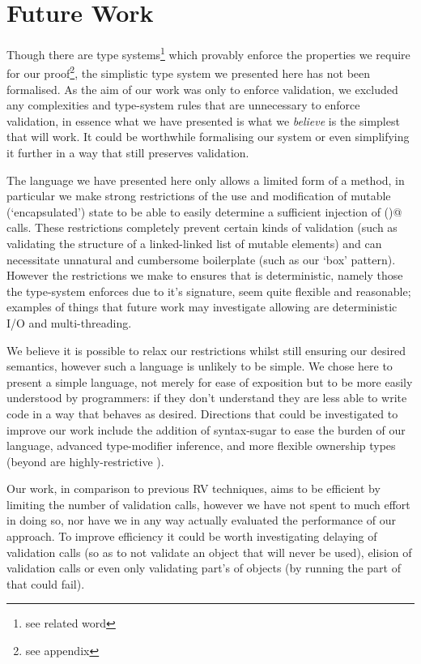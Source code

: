 \section{Future Work}
Though there are type systems\footnote{see related word} which provably enforce the properties we require for our proof\footnote{see appendix}, the simplistic type system we presented here has not been formalised. As the aim of our work was only to enforce validation, we excluded any complexities and type-system rules that are unnecessary to enforce validation, in essence what we have presented is what we \emph{believe} is the simplest that will work. It could be worthwhile formalising our system or even simplifying it further in a way that still preserves validation.

The language we have presented here only allows a limited form of a \Q@validate@ method, in particular we make strong restrictions of the use and modification of mutable (‘encapsulated’) state to be able to easily determine a sufficient injection of \Q@validate()@ calls. These restrictions completely prevent certain kinds of validation (such as validating the structure of a linked-linked list of mutable elements) and can necessitate unnatural and cumbersome boilerplate (such as our ‘box’ pattern). However the restrictions we make to ensures that \Q@validate@ is deterministic, namely those the type-system enforces due to it’s signature, seem quite flexible and reasonable; examples of things that future work may investigate allowing are deterministic I/O and multi-threading. 


We believe it is possible to relax our restrictions whilst still ensuring our desired semantics, however such a language is unlikely to be simple. We chose here to present a simple language, not merely for ease of exposition but to be more easily understood by programmers: if they don’t understand they are less able to write code in a way that behaves as desired. Directions that could be investigated to improve our work include the addition of syntax-sugar to ease the burden of our language, advanced type-modifier inference, and more flexible ownership types (beyond are highly-restrictive \Q@capsule@).


Our work, in comparison to previous RV techniques, aims to be efficient by limiting the number of validation calls, however we have not spent to much effort in doing so, nor have we in any way actually evaluated the performance of our approach. To improve efficiency it could be worth investigating delaying of validation calls (so as to not validate an object that will never be used), elision of validation calls or even only validating part’s of objects (by running the part of \Q@validate@ that could fail).